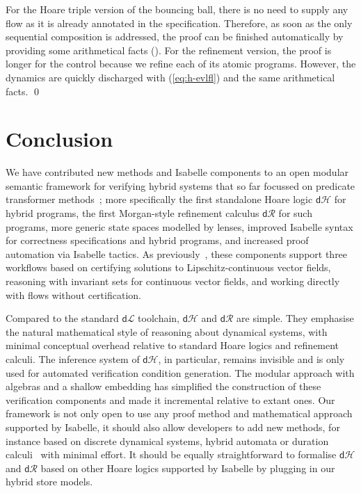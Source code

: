 \documentclass[envcountsame,envcountsect]{llncs}
\newcommand{\dL}{\mathsf{d}\mathcal{L}}
\newcommand{\dH}{\mathsf{d}\mathcal{H}}
\newcommand{\dR}{\mathsf{d}\mathcal{R}}
\begin{document}
\begin{example}
For the Hoare triple version of the bouncing ball, there is no need to supply any flow as it is already annotated in the specification. Therefore, as soon as the only sequential composition is addressed, the proof can be finished automatically by providing some arithmetical facts (). For the refinement version, the proof is longer for the control because we refine each of its atomic programs. However, the dynamics are quickly discharged with (\ref{eq:h-evlfl}) and the same arithmetical facts. \qed
\end{example}




\section{Conclusion}\label{sec:conclusion}

We have contributed new methods and Isabelle components to an open
modular semantic framework for verifying hybrid systems that so far
focussed on predicate transformer methods~\cite{MuniveS19}; more
specifically the first standalone Hoare logic $\dH$ for hybrid
programs, the first Morgan-style refinement calculus $\dR$ for such
programs, more generic state spaces modelled by lenses, improved
Isabelle syntax for correctness specifications and hybrid programs,
and increased proof automation via Isabelle tactics.  As
previously~\cite{MuniveS19}, these components support three workflows
based on certifying solutions to Lipschitz-continuous vector fields,
reasoning with invariant sets for continuous vector fields, and
working directly with flows without certification.

Compared to the standard $\dL$ toolchain, $\dH$ and $\dR$ are
simple. They emphasise the natural mathematical style of reasoning
about dynamical systems, with minimal conceptual overhead relative to
standard Hoare logics and refinement calculi. The inference system of
$\dH$, in particular, remains invisible and is only used for automated
verification condition generation. The modular approach with algebras
and a shallow embedding has simplified the construction of these
verification components and made it incremental relative to extant
ones. Our framework is not only open to use any proof method and
mathematical approach supported by Isabelle, it should also allow
developers to add new methods, for instance based on discrete
dynamical systems, hybrid automata or duration
calculi~\cite{LiuLQZZZZ10} with minimal effort. It should be equally
straightforward to formalise $\dH$ and $\dR$ based on other Hoare
logics supported by Isabelle by plugging in our hybrid store models.
\end{document}
